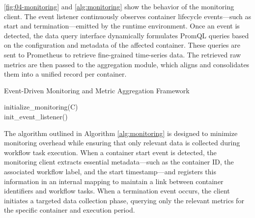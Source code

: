 \ref{fig:04-monitoring} and \ref{alg:monitoring} show the behavior of the monitoring client. The event listener continuously observes container lifecycle events—such as start and termination—emitted by the runtime environment. Once an event is detected, the data query interface dynamically formulates PromQL queries based on the configuration and metadata of the affected container. These queries are sent to Prometheus to retrieve fine-grained time-series data. The retrieved raw metrics are then passed to the aggregation module, which aligns and consolidates them into a unified record per container.

\begin{algorithm}[H]
    \caption{Event-Driven Monitoring and Metric Aggregation Framework}
    \label{alg:monitoring}

    \BlankLine
    initialize\_monitoring(C)\\
    init\_event\_listener()\\
\end{algorithm}

The algorithm outlined in Algorithm \ref{alg:monitoring} is designed to minimize monitoring overhead while ensuring that only relevant data is collected during workflow task execution. When a container start event is detected, the monitoring client extracts essential metadata—such as the container ID, the associated workflow label, and the start timestamp—and registers this information in an internal mapping to maintain a link between container identifiers and workflow tasks. When a termination event occurs, the client initiates a targeted data collection phase, querying only the relevant metrics for the specific container and execution period.

